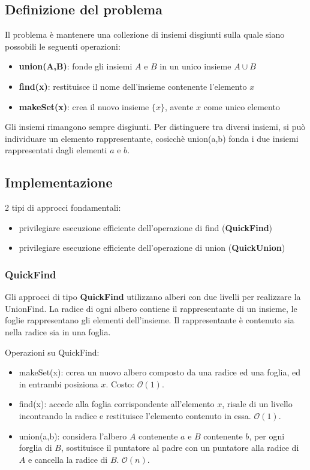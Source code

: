 \documentclass[11pt]{article}
\begin{document}
\subsection{Definizione del problema}
Il problema è mantenere una collezione di insiemi disgiunti sulla quale siano possobili le seguenti operazioni: 
\begin{itemize}
    \item \textbf{union(A,B)}: fonde gli insiemi $A$ e $B$ in un unico insieme $A \cup B$
    \item \textbf{find(x)}: restituisce il nome dell'insieme contenente l'elemento $x$
    \item \textbf{makeSet(x)}: crea il nuovo insieme $\{x\}$, avente $x$ come unico elemento
\end{itemize}
Gli insiemi rimangono sempre disgiunti. Per distinguere tra diversi insiemi, si può individuare un elemento rappresentante,
cosicchè union(a,b) fonda i due insiemi rappresentati dagli elementi $a$ e $b$.
\subsection{Implementazione}
2 tipi di approcci fondamentali:
\begin{itemize}
    \item privilegiare esecuzione efficiente dell'operazione di find (\textbf{QuickFind})
    \item privilegiare esecuzione efficiente dell'operazione di union (\textbf{QuickUnion})
\end{itemize}
\subsubsection{QuickFind}
Gli approcci di tipo \textbf{QuickFind} utilizzano alberi con due livelli per realizzare la UnionFind. La radice di ogni 
albero contiene il rappresentante di un insieme, le foglie rappresentano gli elementi dell'insieme. Il rappresentante è 
contenuto sia nella radice sia in una foglia.

Operazioni su QuickFind:
\begin{itemize}
    \item makeSet(x): ccrea un nuovo albero composto da una radice ed una foglia, ed in entrambi posiziona $x$. Costo: 
    $\mathcal{O}(1)$.
    \item find(x): accede alla foglia corrispondente all'elemento $x$, risale di un livello incontrando la radice e restituisce 
    l'elemento contenuto in essa. $\mathcal{O}(1)$.
    \item union(a,b): considera l'albero $A$ contenente $a$ e $B$ contenente $b$, per ogni forglia di $B$, sostituisce il 
    puntatore al padre con un puntatore alla radice di $A$ e cancella la radice di $B$. $\mathcal{O}(n)$.
\end{itemize}
\end{document}
